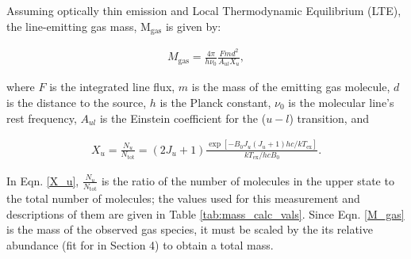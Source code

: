 Assuming optically thin emission and Local Thermodynamic Equilibrium (LTE), the line-emitting gas mass, M$_{\text{gas}}$ is given by:

\begin{align}
  M_{\text{gas}}= \frac{4 \pi}{h \nu_0} \frac{F m d^2}{A_{ul} X_u},
  \label{M_gas}
\end{align}

where $F$ is the integrated line flux, $m$ is the mass of the emitting gas molecule, $d$ is the distance to the source, $h$ is the Planck constant, $\nu_0$ is the molecular line's rest frequency, $A_{ul}$ is the Einstein coefficient for the ($u - l$) transition, and

\begin{align}
  X_u = \frac{N_u}{N_{\text{tot}}} = (2 J_u + 1) \frac{\exp [-B_0 J_u (J_u + 1) h c/kT_{\text{ex}}]}{kT_{\text{ex}}/hc B_0}.
  \label{X_u}
\end{align}

In Eqn. \ref{X_u}, $\frac{N_u}{N_{\text{tot}}}$ is the ratio of the number of molecules in the upper state to the total number of molecules; the values used for this measurement and descriptions of them are given in Table \ref{tab:mass_calc_vals}. Since Eqn. \ref{M_gas} is the mass of the observed gas species, it must be scaled by the its relative abundance (fit for in Section 4) to obtain a total mass.


